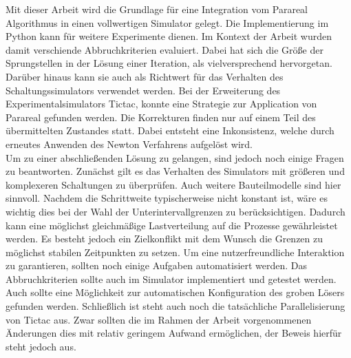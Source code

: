 Mit dieser Arbeit wird die Grundlage für eine Integration vom Parareal Algorithmus in einen vollwertigen Simulator gelegt. Die Implementierung im Python kann für weitere Experimente dienen. Im Kontext der Arbeit wurden damit verschiende Abbruchkriterien evaluiert. Dabei hat sich die Größe der Sprungstellen in der Lösung einer Iteration, als vielversprechend hervorgetan. Darüber hinaus kann sie auch als Richtwert für das Verhalten des Schaltungssimulators verwendet werden. Bei der Erweiterung des Experimentalsimulators Tictac, konnte eine Strategie zur Application von Parareal gefunden werden. Die Korrekturen finden nur auf einem Teil des übermittelten Zustandes statt. Dabei entsteht eine Inkonsistenz, welche durch erneutes Anwenden des Newton Verfahrens aufgelöst wird.\\

Um zu einer abschließenden Lösung zu gelangen, sind jedoch noch einige Fragen zu beantworten. Zunächst gilt es das Verhalten des Simulators mit größeren und komplexeren Schaltungen zu überprüfen. Auch weitere Bauteilmodelle sind hier sinnvoll. Nachdem die Schrittweite typischerweise nicht konstant ist, wäre es wichtig dies bei der Wahl der Unterintervallgrenzen zu berücksichtigen. Dadurch kann eine möglichst gleichmäßige Lastverteilung auf die Prozesse gewährleistet werden. Es besteht jedoch ein Zielkonflikt mit dem Wunsch die Grenzen zu möglichst stabilen Zeitpunkten zu setzen. Um eine nutzerfreundliche Interaktion zu garantieren, sollten noch einige Aufgaben automatisiert werden. Das Abbruchkriterien sollte auch im Simulator implementiert und getestet werden. Auch sollte eine Möglichkeit zur automatischen Konfiguration des groben Lösers gefunden werden. Schließlich ist steht auch noch die tatsächliche Parallelisierung von Tictac aus. Zwar sollten die im Rahmen der Arbeit vorgenommenen Änderungen dies mit relativ geringem Aufwand ermöglichen, der Beweis hierfür steht jedoch aus.